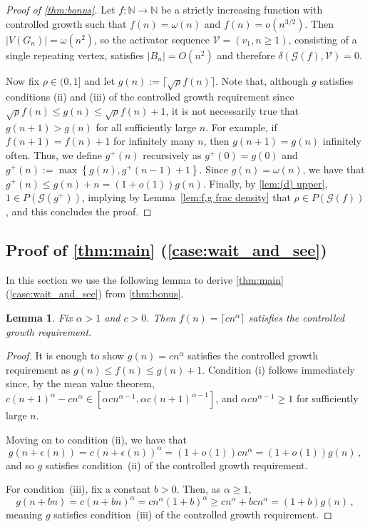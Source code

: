 \documentclass[12pt]{article}
\newtheorem{lemma}[theorem]{Lemma}
\theoremstyle{remark}
\providecommand{\N}{}
\renewcommand{\N}{{\mathbb N}}
\newcommand\cG{\mathcal G}
\newcommand\cV{\mathcal V}
\begin{document}
\begin{proof}[Proof of \cref{thm:bonus}]
Let $f: \N \to \N$ be a strictly increasing function with controlled growth such that $f(n) = \omega(n)$ and $f(n) = o(n^{3/2})$. Then $|V(G_n)| = \omega(n^2)$, so the activator sequence $\cV = (v_1,n \ge 1)$, consisting of a single repeating vertex, satisfies $|B_n| = O(n^2)$ and therefore $\delta(\cG(f),\cV) = 0$. 

Now fix $\rho \in (0,1]$ and let $g(n) := \lceil \sqrt{\rho} f(n) \rceil$. Note that, although $g$ satisfies conditions (ii) and (iii) of the controlled growth requirement since $\sqrt{\rho} f(n) \leq g(n) \leq \sqrt{\rho} f(n) + 1$, it is not necessarily true that $g(n+1)>g(n)$ for all sufficiently large $n$. For example, if $f(n+1) = f(n)+1$ for infinitely many $n$, then $g(n+1) = g(n)$ infinitely often. Thus, we define $g^+(n)$ recursively as $g^+(0) = g(0)$ and $g^+(n) := \max\left\{ g(n), g^+(n-1) + 1 \right\}$. Since $g(n) = \omega(n)$, we have that $g^+(n) \leq g(n) + n = (1+o(1))g(n)$. Finally, by \cref{lem:(d) upper}, $1 \in P(\cG(g^+))$, implying by Lemma~\ref{lem:f,g frac density} that $\rho \in P(\cG(f))$, and this concludes the proof. 
\end{proof}

\subsection{Proof of \cref{thm:main} (\ref{case:wait_and_see})}

In this section we use the following lemma to derive \cref{thm:main} (\ref{case:wait_and_see}) from \cref{thm:bonus}. 

\begin{lemma}\label{lem:poly_has_controlled_growth}
Fix $\alpha > 1$ and $c > 0$. Then $f(n) = \lceil cn^\alpha \rceil$ satisfies the controlled growth requirement.
\end{lemma}

\begin{proof}
It is enough to show $g(n) = cn^\alpha$ satisfies the controlled growth requirement as $g(n) \leq f(n) \leq g(n)+1$. Condition (i) follows immediately since, by the mean value theorem, $c(n+1)^\alpha - cn^\alpha \in [\alpha c n^{\alpha-1}, \alpha c (n+1)^{\alpha-1}]$, and $\alpha c n^{\alpha - 1} \geq 1$ for sufficiently large $n$. 

Moving on to condition (ii), we have that
$$
g(n+\epsilon(n)) 
= 
c(n+\epsilon(n))^\alpha
=
(1+o(1)) cn^\alpha
=
(1+o(1)) g(n)\,,
$$
and so $g$ satisfies condition~(ii) of the controlled growth requirement. 

For condition~(iii), fix a constant $b > 0$. Then, as $\alpha \geq 1$,
\[
g(n+bn) 
=
c(n+bn)^\alpha
= cn^\alpha (1+b)^\alpha
\geq 
cn^\alpha + bcn^\alpha
=
(1+b)g(n) \,,
\]
meaning $g$ satisfies condition~(iii) of the controlled growth requirement. 
\end{proof}
\end{document}
